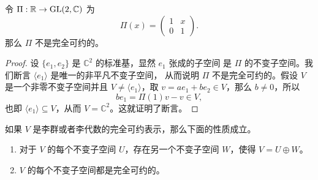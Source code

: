 \begin{example}
  令 $\Pi:\mathbb{R}\to \operatorname{GL}(2,\mathbb{C})$ 为
  \[
    \Pi(x)=\begin{pmatrix}
      1 & x \\
      0 & 1
    \end{pmatrix}.
  \]
  那么 $\Pi$ 不是完全可约的。
\end{example}
\begin{proof}
  设 $\{e_1,e_2\}$ 是 $\mathbb{C}^2$ 的标准基，显然 $e_1$ 张成的子空间
  是 $\Pi$ 的不变子空间。我们断言 $\langle e_1\rangle$ 是唯一的非平凡不变子空间，
  从而说明 $\Pi$ 不是完全可约的。假设 $V$ 是一个非零不变子空间并且 $V\neq\langle e_1\rangle$，取
  $v=ae_1+be_2\in V$，那么 $b\neq 0$，所以
  \[
    be_1=\Pi(1)v-v\in V,
  \]
  也即 $\langle e_1\rangle \subseteq V$，从而 $V=\mathbb{C}^2$。这就证明了断言。
\end{proof}

\begin{proposition}
  如果 $V$ 是李群或者李代数的完全可约表示，那么下面的性质成立。
  \begin{enumerate}
    \item 对于 $V$ 的每个不变子空间 $U$，存在另一个不变子空间 $W$，使得
    $V=U\oplus W$。
    \item $V$ 的每个不变子空间都是完全可约的。
  \end{enumerate}
\end{proposition}








